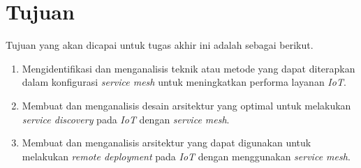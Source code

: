 \section{Tujuan}

Tujuan yang akan dicapai untuk tugas akhir ini adalah sebagai berikut.

\begin{enumerate}
    \item Mengidentifikasi dan menganalisis teknik atau metode yang dapat diterapkan dalam konfigurasi \textit{service mesh} untuk meningkatkan performa layanan \textit{IoT}.
    \item Membuat dan menganalisis desain arsitektur yang optimal untuk melakukan \textit{service discovery} pada \textit{IoT} dengan \textit{service mesh}.
    \item Membuat dan menganalisis arsitektur yang dapat digunakan untuk melakukan \textit{remote deployment} pada \textit{IoT} dengan menggunakan \textit{service mesh}.
\end{enumerate}